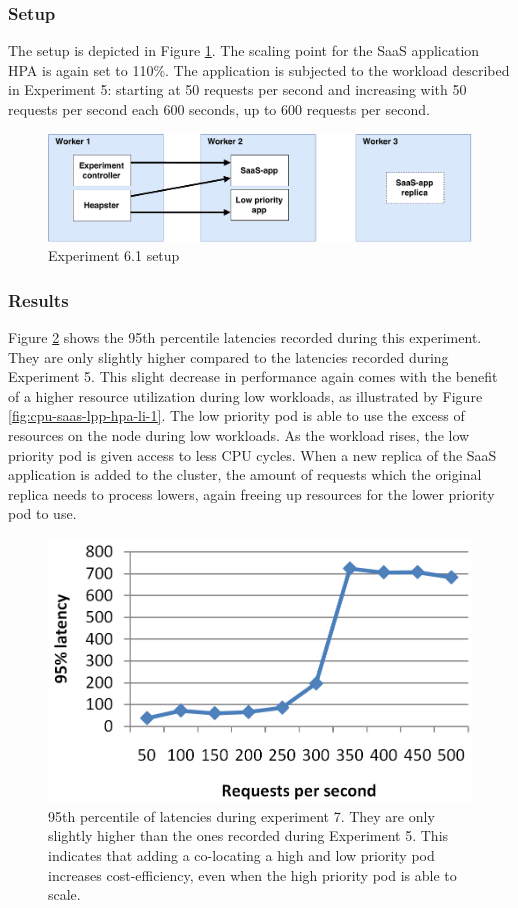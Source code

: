 \subsubsection{Setup}
The setup is depicted in Figure \ref{fig:experiment6}. The scaling point for the SaaS application HPA is again set to 110\%. The application is subjected to the workload described in Experiment 5: starting at 50 requests per second and increasing with 50 requests per second each 600 seconds, up to 600 requests per second.

\begin{figure}
\centering
\includegraphics[width=\columnwidth]{Images/Experiments/Experiment_4_SaaS.pdf}
\caption{Experiment 6.1 setup}
\label{fig:experiment6}
\end{figure}

\subsubsection{Results}
Figure \ref{fig:lat-saas-lpp-hpa-li} shows the 95th percentile latencies recorded during this experiment. They are only slightly higher compared to the latencies recorded during Experiment 5. This slight decrease in performance again comes with the benefit of a higher resource utilization during low workloads, as illustrated by Figure \ref{fig:cpu-saas-lpp-hpa-li-1}. The low priority pod is able to use the excess of resources on the node during low workloads. As the workload rises, the low priority pod is given access to less CPU cycles. When a new replica of the SaaS application is added to the cluster, the amount of requests which the original replica needs to process lowers, again freeing up resources for the lower priority pod to use. 

\begin{figure}
\centering
\includegraphics[width=0.60\columnwidth]{Images/Experiments/CPU/Latencies/lat-saas-lpp-hpa-li.PNG}
\caption{95th percentile of latencies during experiment 7. They are only slightly higher than the ones recorded during Experiment 5. This indicates that adding a co-locating a high and low priority pod increases cost-efficiency, even when the high priority pod is able to scale.}
\label{fig:lat-saas-lpp-hpa-li}
\end{figure}


